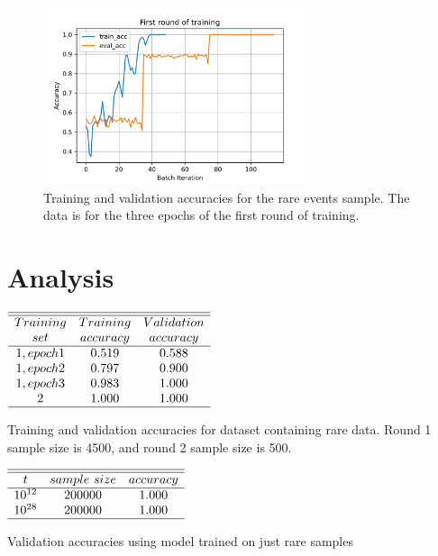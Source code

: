 \documentclass[journal]{IEEEtai}
\begin{document}
\begin{figure}
\centerline{\includegraphics[width=18.5pc]{Figure1.png}}
\caption{Training and validation accuracies for the rare events sample. The data is for 
the three epochs of the first round of training.}
\label{fig:1}
\end{figure}


\section{Analysis}



\begin{table}
\centering \(\begin{array}{ccc}
\hline
\hline
Training  & Training &Validation  \\
set     &accuracy&accuracy\\
\hline
1, epoch 1  & 0.519 & 0.588 \\

1, epoch 2  & 0.797 & 0.900 \\
1, epoch 3  & 0.983 & 1.000 \\

2  & 1.000 & 1.000 \\
\hline
\end{array}\)
\caption{Training and validation accuracies for dataset containing rare data. Round 1 
sample size is 4500, and round 2 sample size is 500.}
\label{tab:accuraciesrare}
\end{table}

\begin{table}
\centering \(\begin{array}{ccc}
\hline
\hline
t     &sample~size&accuracy\\
\hline
10^{12}  & 200000 & 1.000 \\

10^{28}  & 200000 & 1.000 \\
\hline
\end{array}\)
\caption{Validation accuracies using model trained on just  rare samples}
\label{tab:validation}
\end{table}
\end{document}
